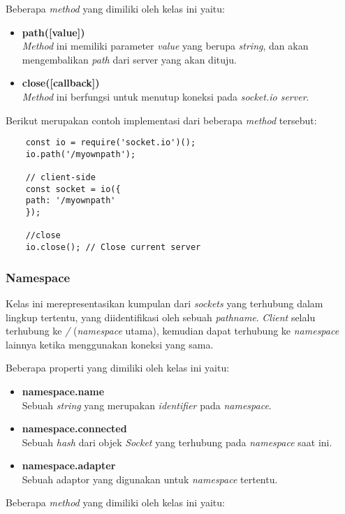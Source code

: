 Beberapa \textit{method} yang dimiliki oleh kelas ini yaitu: 

\begin{itemize}
	\item \textbf{path([value])} \\ \textit{Method} ini memiliki parameter \textit{value} yang berupa \textit{string}, dan akan mengembalikan \textit{path} dari server yang akan dituju.
	\item \textbf{close([callback])} \\ \textit{Method} ini berfungsi untuk menutup koneksi pada \textit{socket.io server}. 
\end{itemize}

Berikut merupakan contoh implementasi dari beberapa \textit{method} tersebut:

\begin{lstlisting}
	const io = require('socket.io')();
	io.path('/myownpath');
	
	// client-side
	const socket = io({
	path: '/myownpath'
	});
	
	//close
	io.close(); // Close current server
\end{lstlisting}
	
\subsubsection{Namespace}
Kelas ini merepresentasikan kumpulan dari \textit{sockets} yang terhubung dalam lingkup tertentu, yang diidentifikasi oleh sebuah \textit{pathname}. \textit{Client} selalu terhubung ke \textit{/} (\textit{namespace} utama), kemudian dapat terhubung ke \textit{namespace} lainnya ketika menggunakan koneksi yang sama.

Beberapa properti yang dimiliki oleh kelas ini yaitu: 
\begin{itemize}
	\item \textbf{namespace.name} \\ Sebuah \textit{string} yang merupakan \textit{identifier} pada \textit{namespace}.
	\item \textbf{namespace.connected} \\ Sebuah \textit{hash} dari objek \textit{Socket} yang terhubung pada \textit{namespace} saat ini.
	\item \textbf{namespace.adapter} \\ Sebuah adaptor yang digunakan untuk \textit{namespace} tertentu.
\end{itemize}

Beberapa \textit{method} yang dimiliki oleh kelas ini yaitu:

